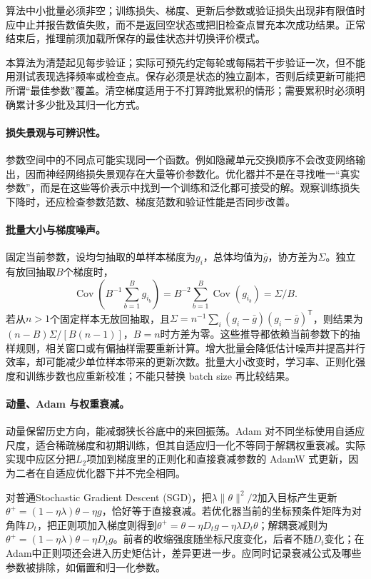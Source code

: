 算法中小批量必须非空；训练损失、梯度、更新后参数或验证损失出现非有限值时应中止并报告数值失败，而不是返回空状态或把旧检查点冒充本次成功结果。正常结束后，推理前须加载所保存的最佳状态并切换评价模式。

本算法为清楚起见每步验证；实际可预先约定每轮或每隔若干步验证一次，但不能用测试表现选择频率或检查点。保存必须是状态的独立副本，否则后续更新可能把所谓“最佳参数”覆盖。清空梯度适用于不打算跨批累积的情形；需要累积时必须明确累计多少批及其归一化方式。

\paragraph{损失景观与可辨识性。}
参数空间中的不同点可能实现同一个函数。例如隐藏单元交换顺序不会改变网络输出，因而神经网络损失景观存在大量等价参数化。优化器并不是在寻找唯一“真实参数”，而是在这些等价表示中找到一个训练和泛化都可接受的解。观察训练损失下降时，还应检查参数范数、梯度范数和验证性能是否同步改善。

\paragraph{批量大小与梯度噪声。}
固定当前参数，设均匀抽取的单样本梯度为$g_i$，总体均值为$\bar g$，协方差为$\Sigma$。独立有放回抽取$B$个梯度时，
\begin{equation}
 \operatorname{Cov}\left(B^{-1}\sum_{b=1}^Bg_{i_b}\right)
 =B^{-2}\sum_{b=1}^B\operatorname{Cov}(g_{i_b})=\Sigma/B.
\end{equation}
若从$n>1$个固定样本无放回抽取，且$\Sigma=n^{-1}\sum_i(g_i-\bar g)(g_i-\bar g)^{\mathsf T}$，则结果为$(n-B)\Sigma/[B(n-1)]$，$B=n$时方差为零。这些推导都依赖当前参数下的抽样规则，相关窗口或有偏抽样需要重新计算。增大批量会降低估计噪声并提高并行效率，却可能减少单位样本带来的更新次数。批量大小改变时，学习率、正则化强度和训练步数也应重新校准；不能只替换 batch size 再比较结果。

\paragraph{动量、Adam 与权重衰减。}
动量保留历史方向，能减弱狭长谷底中的来回振荡。Adam 对不同坐标使用自适应尺度，适合稀疏梯度和初期训练，但其自适应归一化不等同于解耦权重衰减。实际实现中应区分把$L_2$项加到梯度里的正则化和直接衰减参数的 AdamW 式更新，因为二者在自适应优化器下并不完全相同。

对普通Stochastic Gradient Descent (SGD)，把$\lambda\|\theta\|^2/2$加入目标产生更新$\theta^+=(1-\eta\lambda)\theta-\eta g$，恰好等于直接衰减。若优化器当前的坐标预条件矩阵为对角阵$D_t$，把正则项加入梯度则得到$\theta^+=\theta-\eta D_tg-\eta\lambda D_t\theta$；解耦衰减则为$\theta^+=(1-\eta\lambda)\theta-\eta D_tg$。前者的收缩强度随坐标尺度变化，后者不随$D_t$变化；在Adam中正则项还会进入历史矩估计，差异更进一步。应同时记录衰减公式及哪些参数被排除，如偏置和归一化参数。

